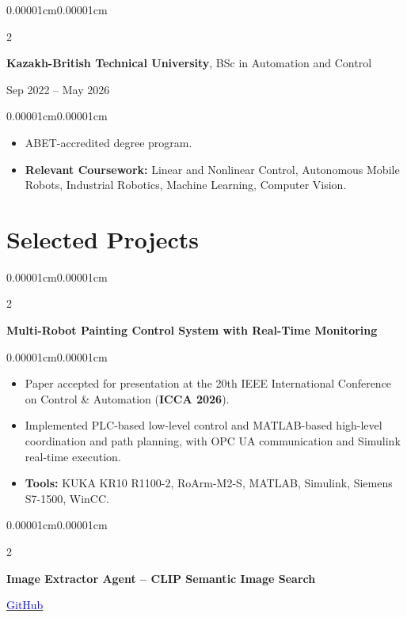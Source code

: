 \documentclass[10pt, a4paper]{article}
\newenvironment{highlights}{
    \begin{itemize}[
        topsep=0.10cm,
        parsep=0.06cm,
        partopsep=0pt,
        itemsep=0pt,
        leftmargin=10pt
    ]
}{
    \end{itemize}
}
\newenvironment{onecolentry}{
    \begin{adjustwidth}{0.00001cm}{0.00001cm}
}{
    \end{adjustwidth}
}
\newenvironment{twocolentry}[2][]{
    \onecolentry
    \def\secondColumn{#2}
    \setcolumnwidth{\fill, 4.5cm}
    \begin{paracol}{2}
}{
    \switchcolumn
    \raggedleft
    \secondColumn
    \end{paracol}
    \endonecolentry
}
\let\hrefWithoutArrow\href
\begin{document}
        \begin{twocolentry}{Sep 2022 -- May 2026}
            \textbf{Kazakh-British Technical University}, BSc in Automation and Control
        \end{twocolentry}
        \vspace{0.10cm}

        \begin{onecolentry}
            \begin{highlights}
                \item ABET-accredited degree program.
                \item \textbf{Relevant Coursework:} Linear and Nonlinear Control, Autonomous Mobile Robots, Industrial Robotics, Machine Learning, Computer Vision.
            \end{highlights}
        \end{onecolentry}

    \section{Selected Projects}

        \begin{twocolentry}{}
            \textbf{Multi-Robot Painting Control System with Real-Time Monitoring}
        \end{twocolentry}
        \vspace{0.10cm}

        \begin{onecolentry}
            \begin{highlights}
                \item Paper accepted for presentation at the 20th IEEE International Conference on Control \& Automation (\textbf{ICCA 2026}).
                \item Implemented PLC-based low-level control and MATLAB-based high-level coordination and path planning, with OPC UA communication and Simulink real-time execution.
                \item \textbf{Tools:} KUKA KR10 R1100-2, RoArm-M2-S, MATLAB, Simulink, Siemens S7-1500, WinCC.
            \end{highlights}
        \end{onecolentry}
        \vspace{0.2cm}

        \begin{twocolentry}{
            \hrefWithoutArrow{https://github.com/rassulz/image_extractor_agent}{\textcolor{blue}{GitHub \faExternalLink*}}
        }
            \textbf{Image Extractor Agent -- CLIP Semantic Image Search}
        \end{twocolentry}
        \vspace{0.10cm}
\end{document}
